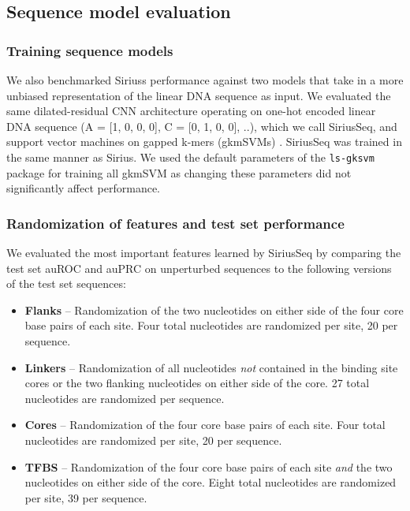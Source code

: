 \subsection{Sequence model evaluation}

\subsubsection{Training sequence models}

We also benchmarked Sirius\textquotesingle s performance against two models that take in a more unbiased representation of the linear DNA sequence as input. We evaluated the same dilated-residual CNN architecture operating on one-hot encoded linear DNA sequence (A = [1, 0, 0, 0], C = [0, 1, 0, 0], ..), which we call SiriusSeq, and support vector machines on gapped k-mers (gkmSVMs) \cite{Ghandi2014-hn}. SiriusSeq was trained in the same manner as Sirius. We used the default parameters of the \texttt{ls-gksvm} package for training all gkmSVM as changing these parameters did not significantly affect performance.

\subsubsection{Randomization of features and test set performance}

We evaluated the most important features learned by SiriusSeq by comparing the test set auROC and auPRC on unperturbed sequences to the following versions of the test set sequences:

\begin{itemize}
    \item \textbf{Flanks} – Randomization of the two nucleotides on either side of the four core base pairs of each site. Four total nucleotides are randomized per site, 20 per sequence.
    \item \textbf{Linkers} – Randomization of all nucleotides \textit{not} contained in the binding site cores or the two flanking nucleotides on either side of the core. 27 total nucleotides are randomized per sequence.
    \item \textbf{Cores} – Randomization of the four core base pairs of each site. Four total nucleotides are randomized per site, 20 per sequence.
    \item \textbf{TFBS} – Randomization of the four core base pairs of each site \textit{and} the two nucleotides on either side of the core. Eight total nucleotides are randomized per site, 39 per sequence.
\end{itemize}

